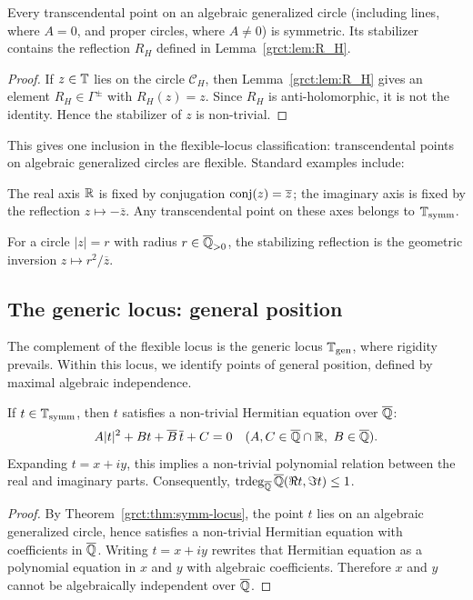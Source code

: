 \begin{proposition}\label{grct:prop:lines-circles-general}
	Every transcendental point on an algebraic generalized circle (including lines, where $A=0$, and proper circles, where $A\ne0$) is symmetric. Its stabilizer contains the reflection $R_H$ defined in Lemma~\ref{grct:lem:R_H}.
\end{proposition}
\begin{proof}
	If $z\in\mathbb{T}$ lies on the circle $\mathcal C_H$, then Lemma~\ref{grct:lem:R_H} gives an element $R_H\in\Gamma^{\pm}$ with $R_H(z)=z$. Since $R_H$ is anti-holomorphic, it is not the identity. Hence the stabilizer of $z$ is non-trivial.
\end{proof}

This gives one inclusion in the flexible-locus classification: transcendental points on algebraic generalized circles are flexible. Standard examples include:

\begin{example}\label{grct:ex:real-imag}
	The real axis $\mathbb{R}$ is fixed by conjugation $\mathrm{conj}(z)=\overline{z}$; the imaginary axis is fixed by the reflection $z\mapsto-\overline z$. Any transcendental point on these axes belongs to $\mathbb{T}_{\mathrm{symm}}$.
\end{example}

\begin{example}\label{grct:ex:algebraic-circles}
	For a circle $|z|=r$ with radius $r\in\overline{\mathbb{Q}}_{>0}$, the stabilizing reflection is the geometric inversion $z\mapsto r^2/\overline z$.
\end{example}

\subsection{The generic locus: general position}

The complement of the flexible locus is the generic locus $\mathbb{T}_{\mathrm{gen}}$, where rigidity prevails. Within this locus, we identify points of general position, defined by maximal algebraic independence.

\begin{lemma}\label{grct:lem:symm-dependence}
	If $t\in\mathbb{T}_{\mathrm{symm}}$, then $t$ satisfies a non-trivial Hermitian equation over $\overline{\mathbb{Q}}$:
	\[
		A|t|^2+B t+\overline{B}\,\overline t+C=0 \quad (A,C\in\Alg\cap\R,\ B\in\Alg).
	\]
	Expanding $t = x+iy$, this implies a non-trivial polynomial relation between the real and imaginary parts. Consequently, $\operatorname{trdeg}_{\overline{\mathbb{Q}}}\overline{\mathbb{Q}}(\Re t,\Im t)\le 1$.
\end{lemma}
\begin{proof}
	By Theorem~\ref{grct:thm:symm-locus}, the point $t$ lies on an algebraic generalized circle, hence satisfies a non-trivial Hermitian equation with coefficients in $\overline{\mathbb{Q}}$. Writing $t=x+iy$ rewrites that Hermitian equation as a polynomial equation in $x$ and $y$ with algebraic coefficients. Therefore $x$ and $y$ cannot be algebraically independent over $\overline{\mathbb{Q}}$.
\end{proof}

